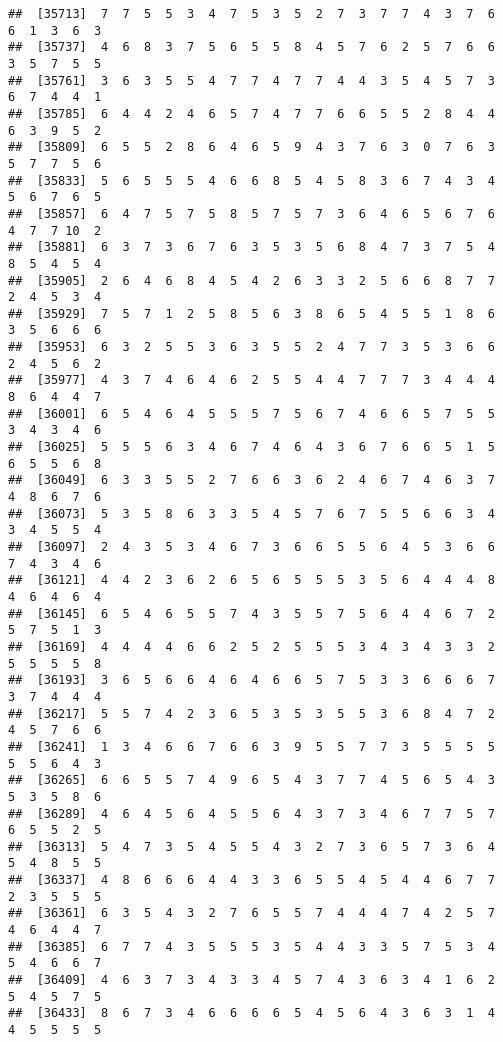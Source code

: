 \documentclass[
]{book}
\begin{document}
\begin{verbatim}
##  [35713]  7  7  5  5  3  4  7  5  3  5  2  7  3  7  7  4  3  7  6  6  1  3  6  3
##  [35737]  4  6  8  3  7  5  6  5  5  8  4  5  7  6  2  5  7  6  6  3  5  7  5  5
##  [35761]  3  6  3  5  5  4  7  7  4  7  7  4  4  3  5  4  5  7  3  6  7  4  4  1
##  [35785]  6  4  4  2  4  6  5  7  4  7  7  6  6  5  5  2  8  4  4  6  3  9  5  2
##  [35809]  6  5  5  2  8  6  4  6  5  9  4  3  7  6  3  0  7  6  3  5  7  7  5  6
##  [35833]  5  6  5  5  5  4  6  6  8  5  4  5  8  3  6  7  4  3  4  5  6  7  6  5
##  [35857]  6  4  7  5  7  5  8  5  7  5  7  3  6  4  6  5  6  7  6  4  7  7 10  2
##  [35881]  6  3  7  3  6  7  6  3  5  3  5  6  8  4  7  3  7  5  4  8  5  4  5  4
##  [35905]  2  6  4  6  8  4  5  4  2  6  3  3  2  5  6  6  8  7  7  2  4  5  3  4
##  [35929]  7  5  7  1  2  5  8  5  6  3  8  6  5  4  5  5  1  8  6  3  5  6  6  6
##  [35953]  6  3  2  5  5  3  6  3  5  5  2  4  7  7  3  5  3  6  6  2  4  5  6  2
##  [35977]  4  3  7  4  6  4  6  2  5  5  4  4  7  7  7  3  4  4  4  8  6  4  4  7
##  [36001]  6  5  4  6  4  5  5  5  7  5  6  7  4  6  6  5  7  5  5  3  4  3  4  6
##  [36025]  5  5  5  6  3  4  6  7  4  6  4  3  6  7  6  6  5  1  5  6  5  5  6  8
##  [36049]  6  3  3  5  5  2  7  6  6  3  6  2  4  6  7  4  6  3  7  4  8  6  7  6
##  [36073]  5  3  5  8  6  3  3  5  4  5  7  6  7  5  5  6  6  3  4  3  4  5  5  4
##  [36097]  2  4  3  5  3  4  6  7  3  6  6  5  5  6  4  5  3  6  6  7  4  3  4  6
##  [36121]  4  4  2  3  6  2  6  5  6  5  5  5  3  5  6  4  4  4  8  4  6  4  6  4
##  [36145]  6  5  4  6  5  5  7  4  3  5  5  7  5  6  4  4  6  7  2  5  7  5  1  3
##  [36169]  4  4  4  4  6  6  2  5  2  5  5  5  3  4  3  4  3  3  2  5  5  5  5  8
##  [36193]  3  6  5  6  6  4  6  4  6  6  5  7  5  3  3  6  6  6  7  3  7  4  4  4
##  [36217]  5  5  7  4  2  3  6  5  3  5  3  5  5  3  6  8  4  7  2  4  5  7  6  6
##  [36241]  1  3  4  6  6  7  6  6  3  9  5  5  7  7  3  5  5  5  5  5  5  6  4  3
##  [36265]  6  6  5  5  7  4  9  6  5  4  3  7  7  4  5  6  5  4  3  5  3  5  8  6
##  [36289]  4  6  4  5  6  4  5  5  6  4  3  7  3  4  6  7  7  5  7  6  5  5  2  5
##  [36313]  5  4  7  3  5  4  5  5  4  3  2  7  3  6  5  7  3  6  4  5  4  8  5  5
##  [36337]  4  8  6  6  6  4  4  3  3  6  5  5  4  5  4  4  6  7  7  2  3  5  5  5
##  [36361]  6  3  5  4  3  2  7  6  5  5  7  4  4  4  7  4  2  5  7  4  6  4  4  7
##  [36385]  6  7  7  4  3  5  5  5  3  5  4  4  3  3  5  7  5  3  4  5  4  6  6  7
##  [36409]  4  6  3  7  3  4  3  3  4  5  7  4  3  6  3  4  1  6  2  5  4  5  7  5
##  [36433]  8  6  7  3  4  6  6  6  6  5  4  5  6  4  3  6  3  1  4  4  5  5  5  5

\end{verbatim}
\end{document}
